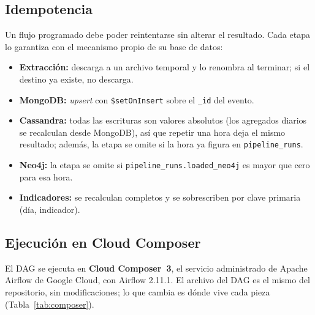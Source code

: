\subsection{Idempotencia}

Un flujo programado debe poder reintentarse sin alterar el resultado. Cada etapa lo garantiza con el mecanismo propio de su base de datos:

\begin{itemize}[leftmargin=*]
    \item \textbf{Extracción:} descarga a un archivo temporal y lo renombra al terminar; si el destino ya existe, no descarga.
    \item \textbf{MongoDB:} \textit{upsert} con \texttt{\$setOnInsert} sobre el \texttt{\_id} del evento.
    \item \textbf{Cassandra:} todas las escrituras son valores absolutos (los agregados diarios se recalculan desde MongoDB), así que repetir una hora deja el mismo resultado; además, la etapa se omite si la hora ya figura en \texttt{pipeline\_runs}.
    \item \textbf{Neo4j:} la etapa se omite si \texttt{pipeline\_runs.loaded\_neo4j} es mayor que cero para esa hora.
    \item \textbf{Indicadores:} se recalculan completos y se sobrescriben por clave primaria (día, indicador).
\end{itemize}

\subsection{Ejecución en Cloud Composer}
\label{subsec:composer}

El DAG se ejecuta en \textbf{Cloud Composer~3}, el servicio administrado de Apache Airflow de Google Cloud, con Airflow 2.11.1. El archivo del DAG es el mismo del repositorio, sin modificaciones; lo que cambia es dónde vive cada pieza (Tabla~\ref{tab:composer}).

